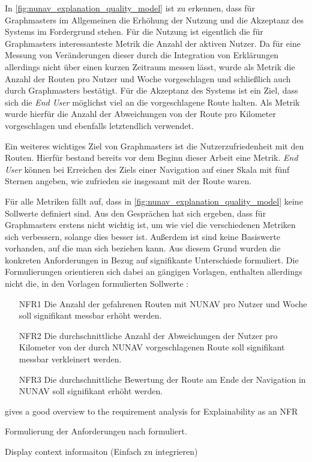 In \autoref{fig:nunav_explanation_quality_model} ist zu erkennen, dass für Graphmasters im Allgemeinen die Erhöhung der Nutzung und die Akzeptanz des Systems im Fordergrund stehen. Für die Nutzung ist eigentlich die für Graphmasters interessanteste Metrik die Anzahl der aktiven Nutzer. Da für eine Messung von Veränderungen dieser durch die Integration von Erklärungen allerdings nicht über einen kurzen Zeitraum messen lässt, wurde  als Metrik die Anzahl der Routen pro Nutzer und Woche vorgeschlagen und schließlich auch durch Graphmasters bestätigt. Für die Akzeptanz des Systems ist ein Ziel, dass sich die \textit{End User} möglichst viel an die vorgeschlagene Route halten. Als Metrik wurde hierfür die Anzahl der Abweichungen von der Route pro Kilometer vorgeschlagen und ebenfalls letztendlich verwendet.

Ein weiteres wichtiges Ziel von Graphmasters ist die Nutzerzufriedenheit mit den Routen. Hierfür bestand bereits vor dem Beginn dieser Arbeit eine Metrik. \textit{End User} können bei Erreichen des Ziels einer Navigation auf einer Skala mit fünf Sternen angeben, wie zufrieden sie insgesamt mit der Route waren.

Für alle Metriken fällt auf, dass in \autoref{fig:nunav_explanation_quality_model} keine Sollwerte definiert sind. Aus den Gesprächen hat sich ergeben, dass für Graphmasters erstens nicht wichtig ist, um wie viel die verschiedenen Metriken sich verbessern, solange dies besser ist. Außerdem ist sind keine Basiswerte vorhanden, auf die man sich beziehen kann. Aus diesem Grund wurden die konkreten Anforderungen in Bezug auf signifikante Unterschiede formuliert. Die Formulierungen orientieren sich dabei an gängigen Vorlagen, enthalten allerdings nicht die, in den Vorlagen formulierten Sollwerte \cite{rajnish2010quality, wiegers1999writing, alexander2002writing}:

\begin{enumerate}
    \item [NFR1] Die Anzahl der gefahrenen Routen mit NUNAV pro Nutzer und Woche soll signifikant messbar erhöht werden.
    \item [NFR2] Die durchschnittliche Anzahl der Abweichungen der Nutzer pro Kilometer von der durch NUNAV vorgeschlagenen Route soll signifikant messbar verkleinert werden.
    \item [NFR3] Die durchschnittliche Bewertung der Route am Ende der Navigation in NUNAV soll signifikant erhöht werden.
\end{enumerate}

\cite{golledge1999wayfinding}

\cite{bovy2012route}

\cite{kohl_explainability_2019} gives a good overview to the requirement analysis for Explainability as an NFR

Formulierung der Anforderungen nach \cite{rajnish2010quality, wiegers1999writing, alexander2002writing} formuliert.

Display context informaiton (Einfach zu integrieren) \cite{wiegand_id_2020}
